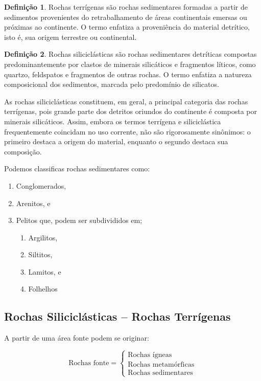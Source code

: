 \documentclass[a4paper,12pt]{article}
\theoremstyle{definition}
\theoremstyle{definition}
\theoremstyle{definition}
\newtheorem{definicao}{Definição}[section]
\begin{document}
\begin{definicao}
Rochas terrígenas são rochas sedimentares formadas a partir de sedimentos provenientes do retrabalhamento de áreas continentais emersas ou próximas ao continente. O termo enfatiza a proveniência do material detrítico, isto é, sua origem terrestre ou continental.
\end{definicao}

\begin{definicao}
Rochas siliciclásticas são rochas sedimentares detríticas compostas predominantemente por clastos de minerais silicáticos e fragmentos líticos, como quartzo, feldspatos e fragmentos de outras rochas. O termo enfatiza a natureza composicional dos sedimentos, marcada pelo predomínio de silicatos.
\end{definicao}

As rochas siliciclásticas constituem, em geral, a principal categoria das rochas terrígenas, pois grande parte dos detritos oriundos do continente é composta por minerais silicáticos. Assim, embora os termos terrígena e siliciclástica frequentemente coincidam no uso corrente, não são rigorosamente sinônimos: o primeiro destaca a origem do material, enquanto o segundo destaca sua composição.

Podemos classificas rochas sedimentares como:
\begin{enumerate}
    \item Conglomerados,
    \item Arenitos, e
    \item Pelitos que,
    podem ser subdivididos em;
        \begin{enumerate}
            \item Argilitos,
            \item Siltitos,
            \item Lamitos, e
            \item Folhelhos
        \end{enumerate}
\end{enumerate}
\subsection{Rochas Siliciclásticas -- Rochas Terrígenas}

A partir de uma área fonte podem se originar:

\[
\text{Rochas fonte} =
\left\{
\begin{array}{l}
\text{Rochas ígneas} \\
\text{Rochas metamórficas} \\
\text{Rochas sedimentares}
\end{array}
\right.
\]
\end{document}
